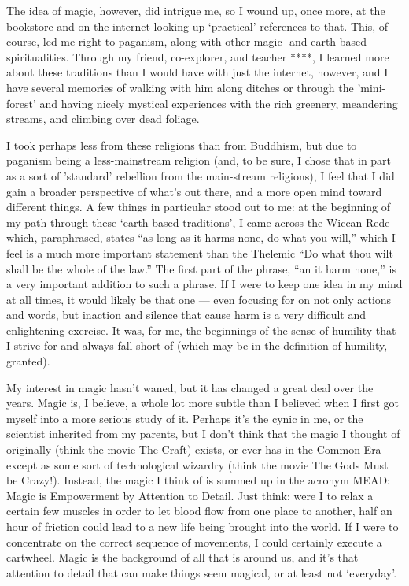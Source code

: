 The idea of magic, however, did intrigue me, so I wound up, once more, at the bookstore and on the internet looking up `practical' references to that. This, of course, led me right to paganism, along with other magic- and earth-based spiritualities. Through my friend, co-explorer, and teacher ****, I learned more about these traditions than I would have with just the internet, however, and I have several memories of walking with him along ditches or through the 'mini-forest' and having nicely mystical experiences with the rich greenery, meandering streams, and climbing over dead foliage.

I took perhaps less from these religions than from Buddhism, but due to paganism being a less-mainstream religion (and, to be sure, I chose that in part as a sort of 'standard' rebellion from the main-stream religions), I feel that I did gain a broader perspective of what's out there, and a more open mind toward different things. A few things in particular stood out to me: at the beginning of my path through these `earth-based traditions', I came across the Wiccan Rede which, paraphrased, states ``as long as it harms none, do what you will,'' which I feel is a much more important statement than the Thelemic ``Do what thou wilt shall be the whole of the law.'' The first part of the phrase, ``an it harm none,'' is a very important addition to such a phrase. If I were to keep one idea in my mind at all times, it would likely be that one --- even focusing for on not only actions and words, but inaction and silence that cause harm is a very difficult and enlightening exercise. It was, for me, the beginnings of the sense of humility that I strive for and always fall short of (which may be in the definition of humility, granted).

My interest in magic hasn't waned, but it has changed a great deal over the years. Magic is, I believe, a whole lot more subtle than I believed when I first got myself into a more serious study of it. Perhaps it's the cynic in me, or the scientist inherited from my parents, but I don't think that the magic I thought of originally (think the movie The Craft) exists, or ever has in the Common Era except as some sort of technological wizardry (think the movie The Gods Must be Crazy!). Instead, the magic I think of is summed up in the acronym MEAD: Magic is Empowerment by Attention to Detail. Just think: were I to relax a certain few muscles in order to let blood flow from one place to another, half an hour of friction could lead to a new life being brought into the world. If I were to concentrate on the correct sequence of movements, I could certainly execute a cartwheel. Magic is the background of all that is around us, and it's that attention to detail that can make things seem magical, or at least not `everyday'.

